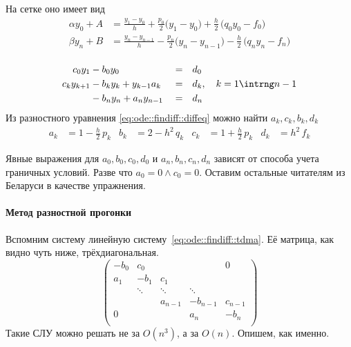 \documentclass{trlnotes}
\begin{document}
\begin{enumerate}
        На сетке оно имеет вид
        \begin{equation*}
          \begin{split}
            α y_0 + A &= \frac{y_1 - y_{0}}{h} + \frac{p_0}{2} \biggl(y_1 - y_{0}\biggr)
            + \frac{h}{2}\,\biggl(q_0 y_0 - f_0\biggr) \\
            β y_n + B &= \frac{y_n - y_{n-1}}{h} - \frac{p_n}{2} \biggl(y_n - y_{n-1}\biggr)
            - \frac{h}{2}\,\biggl(q_n y_n - f_n\biggr) \\
            \end{split}
        \end{equation*}
\end{enumerate}

\begin{equation}\label{eq:ode::findiff::tdma}
  \begin{aligned}
    c_0 y_1     &- b_0 y_0                  &&=& &d_0 \\
    c_k y_{k+1} &- b_k y_k+ y_{k-1} a_k     &&=& &d_k,\quad k= 1\intrng n-1 \\
                &- b_n y_n + a_n y_{n-1}    &&=& &d_n 
  \end{aligned}
\end{equation}
Из разностного уравнения \eqref{eq:ode::findiff::diffeq} можно найти $a_k, c_k, b_k, d_k$
\[
  \begin{aligned}
    a_k &= 1- \tfrac{h}2 \, p_k &
    b_k &= 2- h^2 \, q_k &
    c_k &= 1+ \tfrac{h}2 \, p_k &
    d_k &= {h}^2 \, f_k 
  \end{aligned}
\]

Явные выражения для $a_0, b_0, c_0, d_0$ и $a_n, b_n, c_n, d_n$
зависят от способа учета граничных условий. Разве что $a_0 = 0\land c_0 = 0$.
Оставим остальные читателям из Беларуси в качестве упражнения.

\paragraph{Метод разностной прогонки}
\label{par:ode::fintdma}
Вспомним систему линейную систему~\ref{eq:ode::findiff::tdma}.
Её матрица, как видно чуть ниже, трёхдиагональная.
\[
  \begin{pmatrix}
    -b_0   & c_0    &         &          & 0       \\
    a_1    & -b_1   & c_1     &          &         \\
           & \ddots & \ddots  & \ddots             \\
           &        & a_{n-1} & -b_{n-1} & c_{n-1} \\
    0      &        &         & a_n      & -b_n    \\
  \end{pmatrix}
\]
Такие СЛУ можно решать не за $O(n^3)$, а за $O(n)$. Опишем, как именно.
\end{document}
